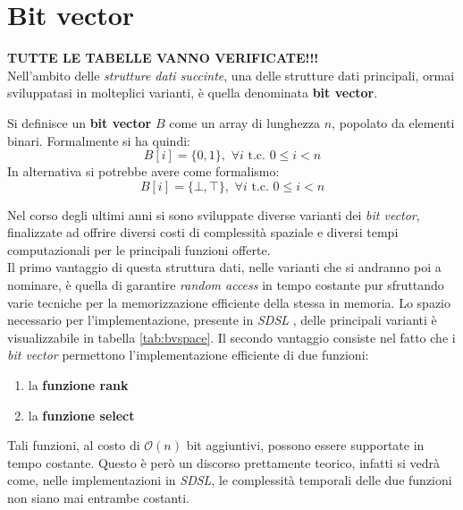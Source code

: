\section{Bit vector}
\textbf{TUTTE LE TABELLE VANNO VERIFICATE!!!}\\
Nell'ambito delle \textit{strutture dati succinte}, una delle strutture dati
principali, ormai sviluppatasi in molteplici varianti, è quella denominata
\textbf{bit vector}.
\begin{definizione}
  Si definisce un \textbf{bit vector} $B$ come un array di lunghezza $n$,
  popolato da elementi binari. Formalmente si ha quindi:
  \[B[i]=\{0,1\},\,\,\forall i \mbox{ t.c. } 0\leq i < n\]
  In alternativa si potrebbe avere come formalismo:
  \[B[i]=\{\bot,\top\},\,\,\forall i \mbox{ t.c. } 0\leq i < n\]
\end{definizione}
Nel corso degli ultimi anni si sono sviluppate diverse varianti dei \textit{bit
  vector}, finalizzate ad offrire diversi costi di complessità spaziale e
diversi tempi computazionali per le principali funzioni offerte.\\
Il primo vantaggio di questa struttura dati, nelle varianti che si andranno poi
a nominare, è quella di garantire \textit{random access} in tempo costante pur
sfruttando varie tecniche per la memorizzazione efficiente della stessa in
memoria. Lo spazio necessario per l'implementazione, presente in
\textit{SDSL} \cite{sdsl}, delle principali varianti è visualizzabile in tabella
\ref{tab:bvspace}. Il secondo vantaggio consiste nel fatto che i \textit{bit
  vector} permettono l'implementazione efficiente di due funzioni:
\begin{enumerate}
  \item la \textbf{funzione rank}
  \item la \textbf{funzione select}
\end{enumerate}
Tali funzioni, al costo di $\mathcal{O}(n)$ bit aggiuntivi, possono essere
supportate in tempo costante. Questo è però un discorso prettamente teorico,
infatti si vedrà come, nelle implementazioni in \textit{SDSL}, le complessità
temporali delle due funzioni non siano mai entrambe costanti.
